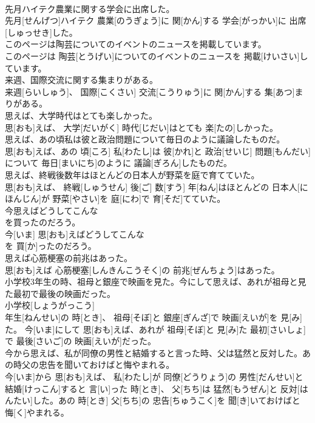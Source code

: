\documentclass[8pt]{extreport}
\begin{document}
\begin{CJK}{UTF8}{min}
\\	先月ハイテク農業に関する学会に出席した。	
\\	先月[せんげつ]ハイテク 農業[のうぎょう]に 関[かん]する 学会[がっかい]に 出席[しゅっせき]した。
\\	このページは陶芸についてのイベントのニュースを掲載しています。	
\\	このページは 陶芸[とうげい]についてのイベントのニュースを 掲載[けいさい]しています。
\\	来週、国際交流に関する集まりがある。	
\\	来週[らいしゅう]、 国際[こくさい] 交流[こうりゅう]に 関[かん]する 集[あつ]まりがある。
\\	思えば、大学時代はとても楽しかった。	
\\	思[おも]えば、 大学[だいがく] 時代[じだい]はとても 楽[たの]しかった。
\\	思えば、あの頃私は彼と政治問題について毎日のように議論したものだ。	
\\	思[おも]えば、あの 頃[ころ] 私[わたし]は 彼[かれ]と 政治[せいじ] 問題[もんだい]について 毎日[まいにち]のように 議論[ぎろん]したものだ。
\\	思えば、終戦後数年はほとんどの日本人が野菜を庭で育てていた。	
\\	思[おも]えば、 終戦[しゅうせん] 後[ご] 数[すう] 年[ねん]はほとんどの 日本人[にほんじん]が 野菜[やさい]を 庭[にわ]で 育[そだ]てていた。
\\	今思えばどうしてこんな
\\	を買ったのだろう。	
\\	今[いま] 思[おも]えばどうしてこんな 
\\	を 買[か]ったのだろう。
\\	思えば心筋梗塞の前兆はあった。	
\\	思[おも]えば 心筋梗塞[しんきんこうそく]の 前兆[ぜんちょう]はあった。
\\	小学校3年生の時、祖母と銀座で映画を見た。今にして思えば、あれが祖母と見た最初で最後の映画だった。	
\\	小学校[しょうがっこう] 
\\	年生[ねんせい]の 時[とき]、 祖母[そぼ]と 銀座[ぎんざ]で 映画[えいが]を 見[み]た。 今[いま]にして 思[おも]えば、あれが 祖母[そぼ]と 見[み]た 最初[さいしょ]で 最後[さいご]の 映画[えいが]だった。
\\	今から思えば、私が同僚の男性と結婚すると言った時、父は猛然と反対した。あの時父の忠告を聞いておけばと悔やまれる。	
\\	今[いま]から 思[おも]えば、 私[わたし]が 同僚[どうりょう]の 男性[だんせい]と 結婚[けっこん]すると 言[い]った 時[とき]、 父[ちち]は 猛然[もうぜん]と 反対[はんたい]した。あの 時[とき] 父[ちち]の 忠告[ちゅうこく]を 聞[き]いておけばと 悔[く]やまれる。

\end{CJK}
\end{document}
